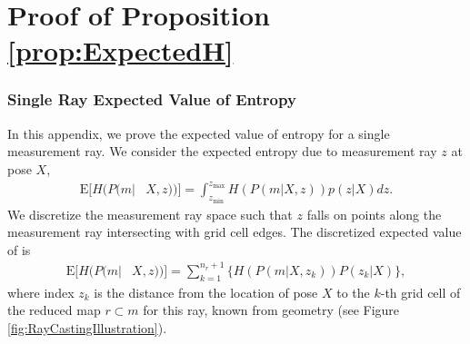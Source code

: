\doublespacing
\chapter{Proof of Proposition \ref{prop:ExpectedH}}

\subsection{Single Ray Expected Value of Entropy}

In this appendix, we prove the expected value of entropy for a single measurement ray. We consider the expected entropy due to measurement ray $z$ at pose $X$,
\begin{align}
\label{eqn:HRayInt}
\text{E}[H(P(m|&X,z))]
=\int_{z_\text{min}}^{z_\text{max}}
H(P(m|X,z))p(z|X)
dz.
\end{align}
We discretize the measurement ray space such that $z$ falls on points along the measurement ray intersecting with grid cell edges.
The discretized expected value of  is
\begin{align}
\label{eqn:DiscExpEntropyRayAppendix}
\text{E}[H(P(m|&X,z))]=\sum_{k=1}^{n_{r}+1}\bigg\{H(P(m|X,z_{k}))P(z_{k}|X)\bigg\},
\end{align}
where index $z_{k}$ is the distance from the location of pose $X$ to the $k$-th grid cell of the reduced map $r\subset m$ for this ray, known from geometry (see Figure \ref{fig:RayCastingIllustration}).

